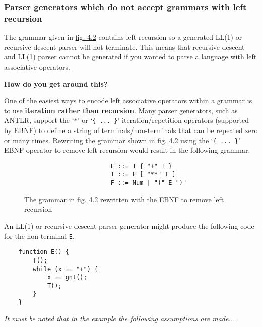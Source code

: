 \subsubsection{Parser generators which do not accept grammars with left recursion}

The grammar given in \hyperref[fig:4.2]{fig. 4.2} contains left recursion so a generated LL(1) or recursive descent parser will not terminate. This means that recursive descent and LL(1) parser cannot be generated if you wanted to parse a language with left associative operators.

\begin{center}
    \textbf{How do you get around this?}
\end{center}

One of the easiest ways to encode left associative operators within a grammar is to use \textbf{iteration rather than recursion}. Many parser generators, such as ANTLR, support the `\verb|*|' or `\verb|{ ... }|' iteration/repetition operators (supported by EBNF) to define a string of terminals/non-terminals that can be repeated zero or many times. Rewriting the grammar shown in \hyperref[fig:4.2]{fig. 4.2} using the `\verb|{ ... }|' EBNF operator to remove left recursion would result in the following grammar.\textsuperscript{\cite{pattis_2021}}

\begin{figure}[H]
    \begin{center}
        \begin{verbatim}
                        E ::= T { "+" T }
                        T ::= F [ "**" T ]
                        F ::= Num | "(" E ")"
        \end{verbatim}
    \end{center}
    \vspace{-1.5em}
    \caption{\label{fig:4.3}The grammar in \hyperref[fig:4.2]{fig. 4.2} rewritten with the EBNF to remove left recursion}
\end{figure}

\pagebreak

An LL(1) or recursive descent parser generator might produce the following code for the non-terminal \verb|E|.

\begin{verbatim}
    function E() {
        T();
        while (x == "+") {
            x == gnt();
            T();
        }
    }
\end{verbatim}

\textit{It must be noted that in the example the following assumptions are made...}

